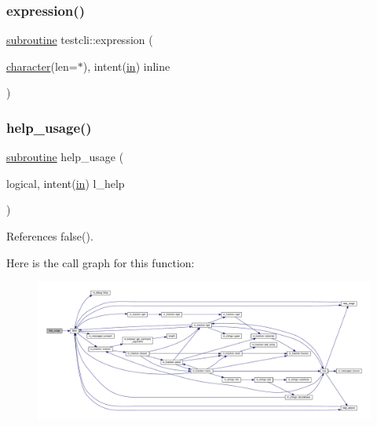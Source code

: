 \subsubsection{\texorpdfstring{expression()}{expression()}}
{\footnotesize\ttfamily \hyperlink{M__stopwatch_83_8txt_acfbcff50169d691ff02d4a123ed70482}{subroutine} testcli\+::expression (\begin{DoxyParamCaption}\item[{\hyperlink{option__stopwatch_83_8txt_abd4b21fbbd175834027b5224bfe97e66}{character}(len=$\ast$), intent(\hyperlink{M__journal_83_8txt_afce72651d1eed785a2132bee863b2f38}{in})}]{inline }\end{DoxyParamCaption})}

\mbox{\label{shell_8f90_a3e09a3b52ee8fb04eeb93fe5761626a8}} 
\subsubsection{\texorpdfstring{help\+\_\+usage()}{help\_usage()}}
{\footnotesize\ttfamily \hyperlink{M__stopwatch_83_8txt_acfbcff50169d691ff02d4a123ed70482}{subroutine} help\+\_\+usage (\begin{DoxyParamCaption}\item[{logical, intent(\hyperlink{M__journal_83_8txt_afce72651d1eed785a2132bee863b2f38}{in})}]{l\+\_\+help }\end{DoxyParamCaption})}



References false().

Here is the call graph for this function\+:
\nopagebreak
\begin{figure}[H]
\begin{center}
\leavevmode
\includegraphics[width=350pt]{shell_8f90_a3e09a3b52ee8fb04eeb93fe5761626a8_cgraph}
\end{center}
\end{figure}
\mbox{\label{shell_8f90_a39c21619b08a3c22f19e2306efd7f766}} 
